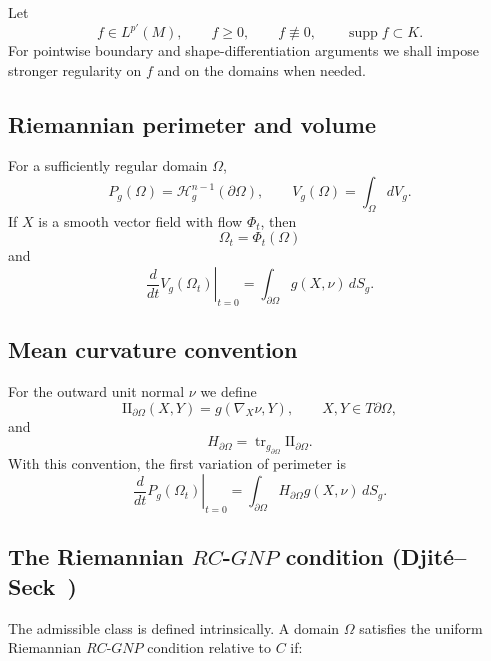 \documentclass{article}
\begin{document}
Let
\[
f\in L^{p'}(M),
\qquad
f\geq0,
\qquad
f\not\equiv0,
\qquad
\operatorname{supp}f\subset K.
\]
For pointwise boundary and shape-differentiation arguments we shall
impose stronger regularity on $f$ and on the domains when needed.

\subsection{Riemannian perimeter and volume}

For a sufficiently regular domain $\Omega$,
\[
P_g(\Omega)=\mathcal H_g^{n-1}(\partial\Omega),
\qquad
V_g(\Omega)=\int_\Omega dV_g.
\]
If $X$ is a smooth vector field with flow $\Phi_t$, then
\[
\Omega_t=\Phi_t(\Omega)
\]
and
\[
\left.\frac d{dt}V_g(\Omega_t)\right|_{t=0}
=
\int_{\partial\Omega}g(X,\nu)\,dS_g.
\]

\subsection{Mean curvature convention}

For the outward unit normal $\nu$ we define
\[
\mathrm{II}_{\partial\Omega}(X,Y)
=
g(\nabla_X\nu,Y),
\qquad
X,Y\in T\partial\Omega,
\]
and
\[
H_{\partial\Omega}
=
\operatorname{tr}_{g_{\partial\Omega}}
\mathrm{II}_{\partial\Omega}.
\]
With this convention, the first variation of perimeter is
\[
\left.\frac d{dt}P_g(\Omega_t)\right|_{t=0}
=
\int_{\partial\Omega}
H_{\partial\Omega}g(X,\nu)\,dS_g.
\]

\subsection{The Riemannian $RC$-$GNP$ condition (Djit\'e--Seck~\cite{DS3})}
\label{def:RC-GNP}

The admissible class is defined intrinsically. A domain $\Omega$
satisfies the uniform Riemannian $RC$-$GNP$ condition relative to $C$
if:
\end{document}
